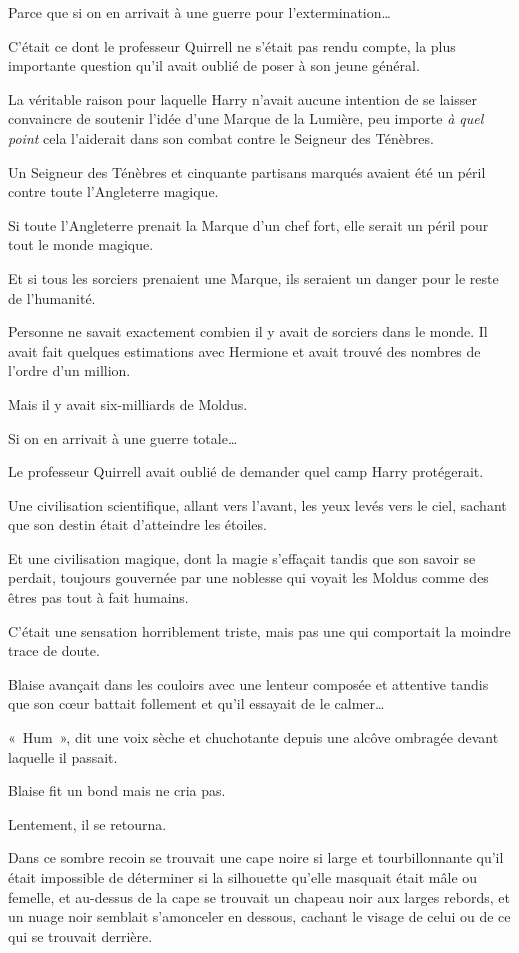 Parce que si on en arrivait à une guerre pour l'extermination…

C'était ce dont le professeur Quirrell ne s'était pas rendu compte, la plus importante question qu'il avait oublié de poser à son jeune général.

La véritable raison pour laquelle Harry n'avait aucune intention de se laisser convaincre de soutenir l'idée d'une Marque de la Lumière, peu importe \emph{à quel point} cela l'aiderait dans son combat contre le Seigneur des Ténèbres.

Un Seigneur des Ténèbres et cinquante partisans marqués avaient été un péril contre toute l'Angleterre magique.

Si toute l'Angleterre prenait la Marque d'un chef fort, elle serait un péril pour tout le monde magique.

Et si tous les sorciers prenaient une Marque, ils seraient un danger pour le reste de l'humanité.

Personne ne savait exactement combien il y avait de sorciers dans le monde. Il avait fait quelques estimations avec Hermione et avait trouvé des nombres de l'ordre d'un million.

Mais il y avait six-milliards de Moldus.

Si on en arrivait à une guerre totale…

Le professeur Quirrell avait oublié de demander quel camp Harry protégerait.

Une civilisation scientifique, allant vers l'avant, les yeux levés vers le ciel, sachant que son destin était d'atteindre les étoiles.

Et une civilisation magique, dont la magie s'effaçait tandis que son savoir se perdait, toujours gouvernée par une noblesse qui voyait les Moldus comme des êtres pas tout à fait humains.

C'était une sensation horriblement triste, mais pas une qui comportait la moindre trace de doute.


Blaise avançait dans les couloirs avec une lenteur composée et attentive tandis que son cœur battait follement et qu'il essayait de le calmer…

«~Hum~», dit une voix sèche et chuchotante depuis une alcôve ombragée devant laquelle il passait.

Blaise fit un bond mais ne cria pas.

Lentement, il se retourna.

Dans ce sombre recoin se trouvait une cape noire si large et tourbillonnante qu'il était impossible de déterminer si la silhouette qu'elle masquait était mâle ou femelle, et au-dessus de la cape se trouvait un chapeau noir aux larges rebords, et un nuage noir semblait s'amonceler en dessous, cachant le visage de celui ou de ce qui se trouvait derrière.

